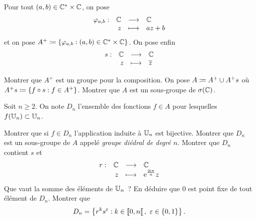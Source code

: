\documentclass{magnolia}
\begin{document}
Pour tout $(a,b)\in\Cs\times\C$, on pose
\[\dspappli{\phi_{a,b}}{\C}{\C}{z}{az+b}\]
et on pose $A^+\defeq\ensim{\phi_{a,b}}{(a,b)\in\Cs\times\C}$. On pose enfin
\[\dspappli{s}{\C}{\C}{z}{\conj{z}}\]
\begin{questions}
\question
\begin{questions}
\question Montrer que $A^+$ est un groupe pour la composition.
\question On pose $A\defeq A^+ \cup A^+ s$ où $A^+ s\defeq\ensim{f\circ s}{f\in A^+}$.
  Montrer que $A$ est un sous-groupe de $\sigma(\C)$.
\end{questions}
\question Soit $n\geq 2$. On note $D_n$ l'ensemble des fonctions $f\in A$ pour
  lesquelles $f(\U[n])\subset\U[n]$.
\begin{questions}
\question Montrer que si $f\in D_n$ l'application induite à $\U[n]$ est bijective.
\question Montrer que $D_n$ est un sous-groupe de $A$ appelé
  \emph{groupe diédral de degré $n$}.
\question Montrer que $D_n$ contient $s$ et
  \[\dspappli{r}{\C}{\C}{z}{\e^{\frac{2\ii\pi}{n}}z}\]
\question Que vaut la somme des éléments de $\U[n]$~? En déduire que 0 est point fixe
  de tout élément de $D_n$.
\question Montrer que
\[D_n=\ensim{r^k s^\epsilon}{k\in\interefo{0}{n}, \ \epsilon\in\ens{0,1}}.\]
\end{questions}
\end{questions}





\end{document}
